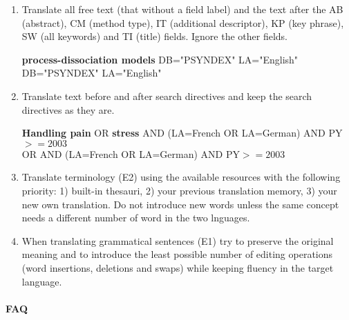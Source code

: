 \documentclass[a4paper,10pt]{article}
\newcommand{\ex}[1]{\begin{tcolorbox}[]{#1}\end{tcolorbox}}
\newcommand{\cris}[1]{{\color{red}{#1}}}
\begin{document}
\begin{enumerate}

 \item Translate all free text (that without a field label) and the text after the AB (abstract), CM (method type), IT (additional descriptor), KP (key phrase), SW (all keywords) and TI (title) fields. Ignore the other fields.
 \ex{{\bf process-dissociation models} DB="PSYNDEX" LA="English" \\
     \cris{add trad: process-dissociation models} DB="PSYNDEX" LA="English"}

 \item Translate text before and after search directives and keep the search directives as they are.
 \ex{{\bf Handling pain} OR {\bf stress} AND (LA=French OR LA=German) AND PY$>=2003$ \\
  \cris{add trad: Handling pain} OR \cris{add trad: stress} AND  (LA=French OR LA=German) AND PY$>=2003$}
  
 \item Translate terminology (E2) using the available resources with the following priority: 1) built-in thesauri, 2) your previous translation memory, 3) your new own translation. Do not introduce new words unless the same concept needs a different number of word in the two lnguages.

 \item When translating grammatical sentences (E1) try to preserve the original meaning and to introduce the least possible number of editing operations (word insertions, deletions and swaps) while keeping fluency in the target language. 

\end{enumerate}



\paragraph{FAQ}
\end{document}
